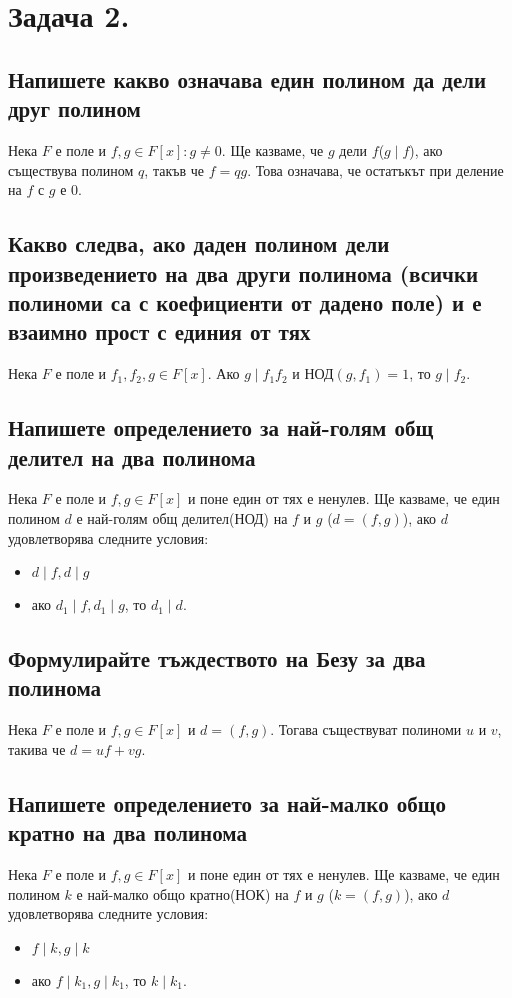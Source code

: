 \documentclass[10pt]{article}
\begin{document}
\section*{Задача 2.}

\subsection*{Напишете какво означава един полином да дели друг полином}
Нека $F$ е поле и $f, g \in F[x]: g \neq 0$. Ще казваме, че $g$ дели $f$($g \mid f$), ако съществува полином $q$, такъв че $f = qg$. Това означава, че остатъкът при деление на $f$ с $g$ е $0$.

\subsection*{Какво следва, ако даден полином дели произведението на два други полинома (всички полиноми са с коефициенти от дадено поле) и е взаимно прост с единия от тях}
Нека $F$ е поле и $f_1, f_2, g \in F[x]$. Ако $g \mid f_1f_2$ и НОД$(g, f_1) = 1$, то $g \mid f_2$.

\subsection*{Напишете определението за най-голям общ делител на два полинома}
Нека $F$ е поле и $f, g \in F[x]$ и поне един от тях е ненулев. Ще казваме, че един полином $d$ е най-голям общ делител(НОД) на $f$ и $g$ ($d = (f, g)$), ако $d$ удовлетворява следните условия:
\begin{itemize}
	\item $d \mid f, d \mid g$
	\item ако $d_1 \mid f, d_1 \mid g$, то $d_1 \mid d$.
\end{itemize}

\subsection*{Формулирайте тъждеството на Безу за два полинома}
Нека $F$ е поле и $f, g \in F[x]$ и $d = (f, g)$. Тогава съществуват полиноми $u$ и $v$, такива че $d = uf + vg$.

\subsection*{Напишете определението за най-малко общо кратно на два полинома}
Нека $F$ е поле и $f, g \in F[x]$ и поне един от тях е ненулев. Ще казваме, че един полином $k$ е най-малко общо кратно(НОК) на $f$ и $g$ ($k = (f, g)$), ако $d$ удовлетворява следните условия:
\begin{itemize}
	\item $f \mid k, g \mid k$
	\item ако $f \mid k_1, g \mid k_1$, то $k \mid k_1$.
\end{itemize}
\end{document}
